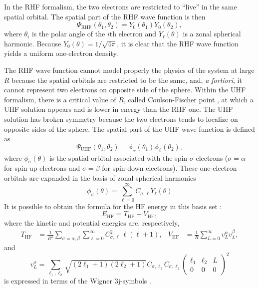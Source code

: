\documentclass[11pt,a4paper]{article}
\begin{document}
In the RHF formalism, the two electrons are restricted to ``live'' in the same spatial orbital.
The spatial part of the RHF wave function is then
\begin{equation}\label{eq:RHF_WF}
	\Psi_{\text{RHF}}(\theta_1,\theta_2) = Y_0(\theta_1) Y_0(\theta_2),
\end{equation}
where $\theta_i$ is the polar angle of the $i$th electron and $Y_{\ell}(\theta)$ is a zonal spherical harmonic. 
Because $Y_0(\theta) = 1/\sqrt{4\pi}$, it is clear that the RHF wave function yields a uniform one-electron density.

The RHF wave function cannot model properly the physics of the system at large $R$ because the spatial orbitals are restricted to be the same, and, \textit{a fortiori}, it cannot represent two electrons on opposite side of the sphere. 
Within the UHF formalism, there is a critical value of $R$, called Coulson-Fischer point \cite{Coulson_1949}, at which a UHF solution appears and is lower in energy than the RHF one.
The UHF solution has broken symmetry because the two electrons tends to localize on opposite sides of the sphere. 
The spatial part of the UHF wave function is defined as
\begin{equation}\label{eq:UHF_WF}
	\Psi_{\text{UHF}}(\theta_1,\theta_2)=\phi_\alpha(\theta_1)\phi_\beta(\theta_2),
\end{equation}
where $\phi_\sigma(\theta)$ is the spatial orbital associated with the spin-$\sigma$ electrons ($\sigma = \alpha$ for spin-up electrons and $\sigma = \beta$ for spin-down electrons).
These one-electron orbitals are expanded in the basis of zonal spherical harmonics
\begin{equation}
	\phi_\sigma(\theta)=\sum_{\ell=0}^{\infty}C_{\sigma,\ell}Y_{\ell}(\theta)
\end{equation}
It is possible to obtain the formula for the HF energy in this basis set \cite{Loos_2009}:
\begin{equation}
	E_{\text{HF}} = T_{\text{HF}} + V_{\text{HF}},
\label{eq:EHF}
\end{equation}
where the kinetic and potential energies are, respectively,
\begin{align}
	T_{\text{HF}} & = \frac{1}{R^2} \sum_{\sigma=\alpha,\beta} \sum_{\ell=0}^{\infty} C_{\sigma,\ell}^2 \, \ell(\ell+1),
	&
	V_{\text{HF}} & = \frac{1}{R} \sum_{L=0}^{\infty}
	v^\alpha_{L} v^\beta_{L},
\end{align}
and
\begin{equation}
	v^\sigma_{L} 
	=  \sum_{\ell_1,\ell_2} \sqrt{(2\ell_1+1)(2\ell_2+1)} C_{\sigma,\ell_1}C_{\sigma,\ell_2}
	\begin{pmatrix}
		\ell_1 & \ell_2 & L 
		\\
		0 & 0 & 0
	\end{pmatrix}^2 
\end{equation}
is expressed in terms of the Wigner 3j-symbols \cite{AngularBook}.
\end{document}

